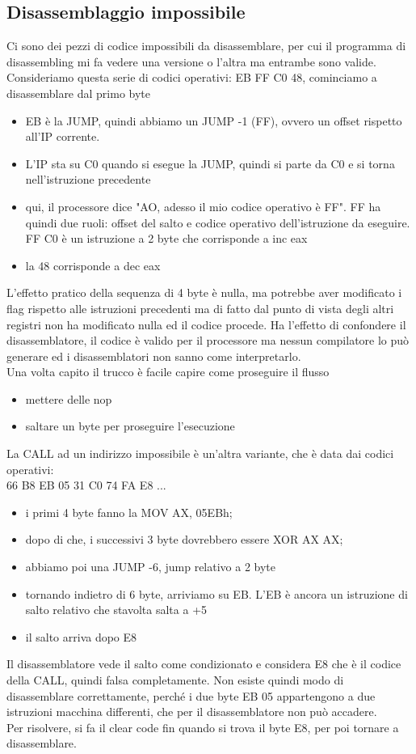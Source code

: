 \documentclass[12pt, oneside]{extbook}
\begin{document}
\subsection{Disassemblaggio impossibile}
Ci sono dei pezzi di codice impossibili da disassemblare, per cui il programma di disassembling mi fa vedere una versione o l'altra ma entrambe sono valide. Consideriamo questa serie di codici operativi:
EB FF C0 48, cominciamo a disassemblare dal primo byte
\begin{itemize}
\item EB è la JUMP, quindi abbiamo un JUMP -1 (FF), ovvero un offset rispetto all'IP corrente.
\item L'IP sta su C0 quando si esegue la JUMP, quindi si parte da C0 e si torna nell'istruzione precedente
\item qui, il processore dice "AO, adesso il mio codice operativo è FF". FF ha quindi due ruoli: offset del salto e codice operativo dell'istruzione da eseguire. FF C0 è un istruzione a 2 byte che corrisponde a inc eax
\item la 48 corrisponde a dec eax
\end{itemize}
L'effetto pratico della sequenza di 4 byte è nulla, ma potrebbe aver modificato i flag rispetto alle istruzioni precedenti ma di fatto dal punto di vista degli altri registri non ha modificato nulla ed il codice procede. Ha l'effetto di confondere il disassemblatore, il codice è valido per il processore ma nessun compilatore lo può generare ed i disassemblatori non sanno come interpretarlo.\\Una volta capito il trucco è facile capire come proseguire il flusso
\begin{itemize}
\item mettere delle nop
\item saltare un byte per proseguire l'esecuzione
\end{itemize}
La CALL ad un indirizzo impossibile è un'altra variante, che è data dai codici operativi:\\
66 B8 EB 05 31 C0 74 FA E8 ...
\begin{itemize}
\item i primi 4 byte fanno la MOV AX, 05EBh;
\item dopo di che, i successivi 3 byte dovrebbero essere XOR AX AX;
\item abbiamo poi una JUMP -6, jump relativo a 2 byte
\item tornando indietro di 6 byte, arriviamo su EB. L'EB è ancora un istruzione di salto relativo che stavolta salta a +5
\item il salto arriva dopo E8
\end{itemize}
Il disassemblatore vede il salto come condizionato e considera E8 che è il codice della CALL, quindi falsa completamente. Non esiste quindi modo di disassemblare correttamente, perché i due byte EB 05 appartengono a due istruzioni macchina differenti, che per il disassemblatore non può accadere.\\Per risolvere, si fa il clear code fin quando si trova il byte E8, per poi tornare a disassemblare.
\end{document}
